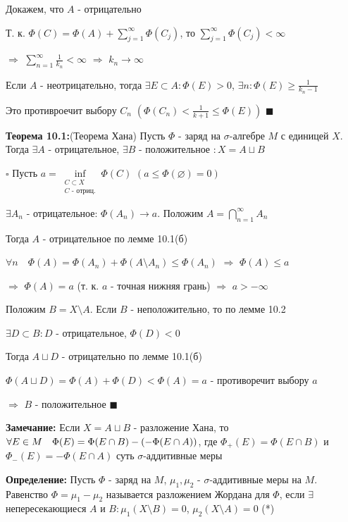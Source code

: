 \documentclass[a4paper]{report}
\newcommand*{\hm}[1]{#1\nobreak\discretionary{}%
            {\hbox{$\mathsurround=0pt #1$}}{}}
\begin{document}
Докажем, что $A$ - отрицательно

Т. к. $\Phi(C)=\Phi(A)+\sum\limits_{j=1}^\infty\Phi(C_j)$, то $\sum\limits_{j=1}^\infty\Phi(C_j)<\infty$ 

$\Rightarrow$ $\sum\limits_{n=1}^\infty\displaystyle\frac{1}{k_n}<\infty$ $\Rightarrow$ $k_n\to\infty$

Если $A$ - неотрицательно, тогда $\exists E\subset A\colon\Phi(E)>0$, $\exists n\colon\Phi(E)\ge\displaystyle\frac{1}{k_n-1}$

Это противроечит выбору $C_n$ $\left(\Phi(C_n)<\displaystyle\frac{1}{k+1}\le\Phi(E)\right)$ $\blacksquare$
\bigskip


\noindent\textbf{Теорема 10.1:}(Теорема Хана) Пусть $\Phi$ - заряд на $\sigma$-алгебре $M$ с единицей $X$. Тогда $\exists A$ - отрицательное, $\exists B$ - положительное $\colon X=A\sqcup B$

\noindent$\square$ Пусть $a=\inf\limits_{\substack{C\subset X\\C\text{ - отриц.}}}\Phi(C)$ $\left(a\le\Phi(\varnothing)=0\right)$

$\exists A_n$ - отрицательное: $\Phi(A_n)\to a$. Положим $A=\bigcap\limits_{n=1}^\infty A_n$

Тогда $A$ - отрицательное по лемме 10.1(б)

$\forall n\quad\Phi(A)=\Phi(A_n)+\Phi(A\setminus A_n)\le\Phi(A_n)$ $\Rightarrow$ $\Phi(A)\le a$

$\Rightarrow$ $\Phi(A)=a$ (т. к. $a$ - точная нижняя грань) $\Rightarrow$ $a>-\infty$

Положим $B=X\setminus A$. Если $B$ - неположительно, то по лемме 10.2 

\noindent$\exists D\subset B\colon D$ - отрицательное, $\Phi(D)<0$

Тогда $A\sqcup D$ - отрицательно по лемме 10.1(б)

$\Phi(A\sqcup D)=\Phi(A)+\Phi(D)<\Phi(A)=a$ - противоречит выбору $a$ 

$\Rightarrow$ $B$ - положительное $\blacksquare$


\bigskip

\noindent\textbf{Замечание:} Если $X=A\sqcup B$ - разложение Хана, то $\forall E\in M\quad\Phi(E)\hm=\Phi(E\cap B)-(-\Phi(E\cap A))$, где $\Phi_+(E)=\Phi(E\cap B)$ и 
$\Phi_-(E)=-\Phi(E\cap A)$ суть $\sigma$-аддитивные меры
\bigskip

\noindent\textbf{Определение:} Пусть $\Phi$ - заряд на $M$, $\mu_1,\mu_2$ - $\sigma$-аддитивные меры на $M$. Равенство $\Phi=\mu_1-\mu_2$ называется разложением Жордана для $\Phi$, если $\exists$ непересекающиеся $A$ и $B\colon\mu_1(X\setminus B)=0$, $\mu_2(X\setminus A)=0$ (*)
\bigskip
\end{document}

